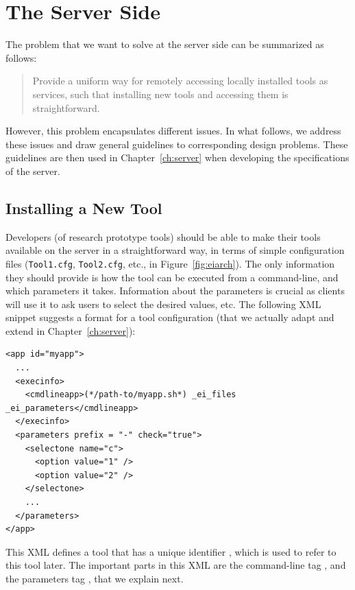 \section{The Server Side}
\label{sec:architecture:server}

The problem that we want to solve at the server side can be summarized
as follows:
%
\begin{quote}
  Provide a uniform way for remotely accessing locally installed tools
  as services, such that installing new tools and accessing them is
  straightforward.
\end{quote}
%
However, this problem encapsulates different issues. In what follows,
we address these issues and draw general guidelines to corresponding
design problems. These guidelines are then used in
Chapter~\ref{ch:server} when developing the specifications of the \ei
server.

\subsection{Installing a New Tool}

Developers (of research prototype tools) should be able to make their
tools available on the server in a straightforward way, in terms of
simple configuration files (\texttt{Tool1.cfg}, \texttt{Tool2.cfg},
etc., in Figure~\ref{fig:eiarch}).
%
The only information they should provide is how the tool can be
executed from a command-line, and which parameters it takes.
%
Information about the parameters is crucial as clients will use it to
ask users to select the desired values, etc.
%
The following XML snippet suggests a format for a tool configuration
(that we actually adapt and extend in Chapter~\ref{ch:server}):

\medskip
\begin{lstlisting}
<app id="myapp">
  ...
  <execinfo>
    <cmdlineapp>(*/path-to/myapp.sh*) _ei_files _ei_parameters</cmdlineapp>
  </execinfo>
  <parameters prefix = "-" check="true">
    <selectone name="c">
      <option value="1" />
      <option value="2" />
    </selectone>
    ...
  </parameters>
</app>
\end{lstlisting}

\medskip
\noindent
This XML defines a tool that has a unique identifier ,
which is used to refer to this tool later.  The important parts in
this XML are the command-line tag , and the parameters
tag , that we explain next.

